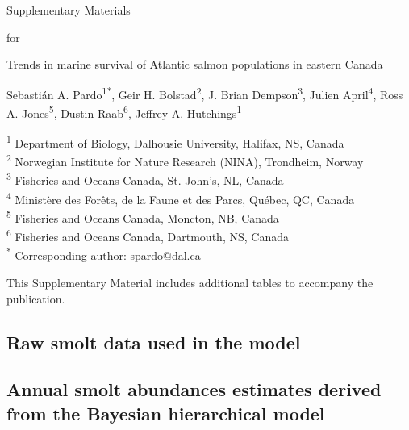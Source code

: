 \documentclass[12pt]{article}
\newcommand{\beginsupplement}{%
        \setcounter{table}{0}
        \renewcommand{\thetable}{S\arabic{table}}%
        \setcounter{figure}{0}
        \renewcommand{\thefigure}{S\arabic{figure}}%
     }
\begin{document}
\linenumbers


\noindent
{\Large Supplementary Materials}
\newline

\noindent
{\Large for}
\newline

\noindent
{\large Trends in marine survival of Atlantic salmon populations in eastern Canada}
\newline

\noindent
Sebasti\'{a}n A. Pardo\textsuperscript{1*}, Geir H. Bolstad\textsuperscript{2}, J. Brian Dempson\textsuperscript{3}, 
        Julien April\textsuperscript{4}, Ross A. Jones\textsuperscript{5}, %
        Dustin Raab\textsuperscript{6}, Jeffrey A. Hutchings\textsuperscript{1}
\newline

\noindent
\small{\textsuperscript{1} Department of Biology, Dalhousie University, Halifax, NS, Canada\\}
\small{\textsuperscript{2} Norwegian Institute for Nature Research (NINA), Trondheim, Norway\\}
\small{\textsuperscript{3} Fisheries and Oceans Canada, St. John's, NL, Canada\\}
\small{\textsuperscript{4} Minist\`{e}re des For\^{e}ts, de la Faune et des Parcs, Qu\'{e}bec, QC, Canada\\}
\small{\textsuperscript{5} Fisheries and Oceans Canada, Moncton, NB, Canada\\}
\small{\textsuperscript{6} Fisheries and Oceans Canada, Dartmouth, NS, Canada\\}
\small{\textsuperscript{*} Corresponding author: spardo@dal.ca}
\beginsupplement

This Supplementary Material includes additional tables to accompany the publication. 

\clearpage

\subsection*{Raw smolt data used in the model}






\subsection*{Annual smolt abundances estimates derived from the Bayesian hierarchical model}
\end{document}
